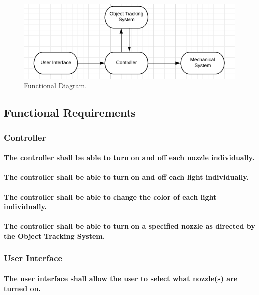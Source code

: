 \begin{figure}[h]
\begin{centering}
\includegraphics{Functional_Diagram.png}
\caption{\label{fig:functional_diagram}Functional Diagram.}
\end{centering}
\end{figure}

\subsection{Functional Requirements}

\subsubsection{Controller}
\paragraph{The controller shall be able to turn on and off each nozzle individually.}
\paragraph{The controller shall be able to turn on and off each light individually.}
\paragraph{The controller shall be able to change the color of each light individually.}
\paragraph{The controller shall be able to turn on a specified nozzle as directed by the Object Tracking System.}

\subsubsection{User Interface}
\paragraph{The user interface shall allow the user to select what nozzle(s) are turned on.}
